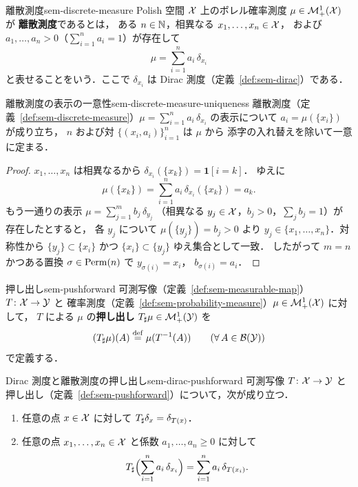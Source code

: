 \begin{definition}{離散測度}{sem-discrete-measure}
  Polish 空間 $\mathcal{X}$ 上のボレル確率測度 $\mu \in \mathcal{M}_+^1(\mathcal{X})$ が
  \textbf{離散測度}であるとは，
  ある $n \in \mathbb{N}$，相異なる $x_1, \ldots, x_n \in \mathcal{X}$，
  および $a_1, \ldots, a_n > 0$（$\sum_{i=1}^n a_i = 1$）が存在して
  \[
    \mu = \sum_{i=1}^{n} a_i\, \delta_{x_i}
  \]
  と表せることをいう．ここで $\delta_{x_i}$ は
  Dirac 測度（定義~\ref{def:sem-dirac}）である．
\end{definition}

\begin{claim}{離散測度の表示の一意性}{sem-discrete-measure-uniqueness}
  離散測度（定義~\ref{def:sem-discrete-measure}）$\mu = \sum_{i=1}^{n} a_i\, \delta_{x_i}$ の表示について
  $a_i = \mu(\{x_i\})$ が成り立ち，
  $n$ および対 $\{(x_i, a_i)\}_{i=1}^{n}$ は $\mu$ から
  添字の入れ替えを除いて一意に定まる．
\end{claim}

\begin{proof}
  $x_1, \ldots, x_n$ は相異なるから
  $\delta_{x_i}(\{x_k\}) = \mathbf{1}[i = k]$．
  ゆえに
  \[
    \mu(\{x_k\}) = \sum_{i=1}^{n} a_i\, \delta_{x_i}(\{x_k\}) = a_k.
  \]
  もう一通りの表示
  $\mu = \sum_{j=1}^{m} b_j\, \delta_{y_j}$
  （相異なる $y_j \in \mathcal{X}$，$b_j > 0$，$\sum_j b_j = 1$）が存在したとすると，
  各 $y_j$ について $\mu(\{y_j\}) = b_j > 0$ より
  $y_j \in \{x_1, \ldots, x_n\}$．対称性から $\{y_j\} \subset \{x_i\}$ かつ
  $\{x_i\} \subset \{y_j\}$ ゆえ集合として一致．
  したがって $m = n$ かつある置換 $\sigma \in \operatorname{Perm}(n)$ で $y_{\sigma(i)} = x_i$，
  $b_{\sigma(i)} = a_i$．
\end{proof}

\begin{definition}{押し出し}{sem-pushforward}
  可測写像（定義~\ref{def:sem-measurable-map}）$T \colon \mathcal{X} \to \mathcal{Y}$ と
  確率測度（定義~\ref{def:sem-probability-measure}）$\mu \in \mathcal{M}_+^1(\mathcal{X})$ に対して，
  $T$ による $\mu$ の\textbf{押し出し} $T_\sharp \mu \in \mathcal{M}_+^1(\mathcal{Y})$ を
  \[
    (T_\sharp \mu)(A) \overset{\mathrm{def}}{=} \mu(T^{-1}(A))
    \qquad (\forall\, A \in \mathcal{B}(\mathcal{Y}))
  \]
  で定義する．
\end{definition}

\begin{proposition}{Dirac 測度と離散測度の押し出し}{sem-dirac-pushforward}
  可測写像 $T \colon \mathcal{X} \to \mathcal{Y}$ と
  押し出し（定義~\ref{def:sem-pushforward}）について，次が成り立つ．
  \begin{enumerate}
    \item[(i)] 任意の点 $x \in \mathcal{X}$ に対して
      $T_\sharp \delta_x = \delta_{T(x)}$．
    \item[(ii)] 任意の点 $x_1, \ldots, x_n \in \mathcal{X}$ と係数
      $a_1, \ldots, a_n \geq 0$ に対して
      \[
        T_\sharp \Bigl(\sum_{i=1}^{n} a_i\, \delta_{x_i}\Bigr)
        = \sum_{i=1}^{n} a_i\, \delta_{T(x_i)}.
      \]
  \end{enumerate}
\end{proposition}

